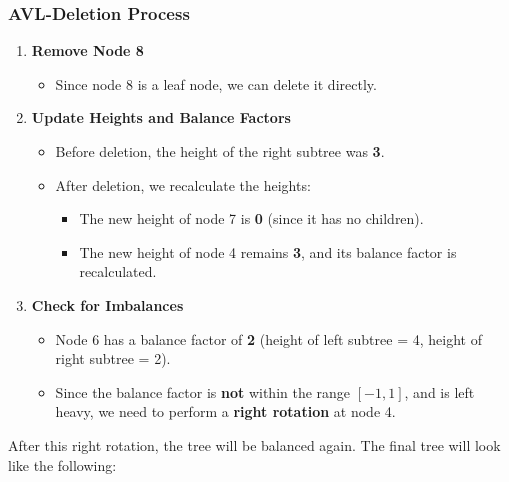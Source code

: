 \documentclass[12pt]{article}
\begin{document}
\subsubsection*{AVL-Deletion Process}
\begin{enumerate}
    \item \textbf{Remove Node 8}
    \begin{itemize}
        \item Since node 8 is a leaf node, we can delete it directly.
    \end{itemize}

    \item \textbf{Update Heights and Balance Factors}
    \begin{itemize}
        \item Before deletion, the height of the right subtree was \textbf{3}.
        \item After deletion, we recalculate the heights:
        \begin{itemize}
            \item The new height of node 7 is \textbf{0} (since it has no children).
            \item The new height of node 4 remains \textbf{3}, and its balance factor is recalculated.
        \end{itemize}
    \end{itemize}

    \item \textbf{Check for Imbalances}
    \begin{itemize}
        \item Node 6 has a balance factor of \textbf{2} (height of left subtree = 4, height of right subtree = 2).
        \item Since the balance factor is \textbf{not} within the range \([-1,1]\), and is left heavy, we need to perform a \textbf{right rotation} at node 4.
    \end{itemize}
\end{enumerate}

After this right rotation, the tree will be balanced again. The final tree will look like the following:
\begin{center}
\end{center}
\end{document}
